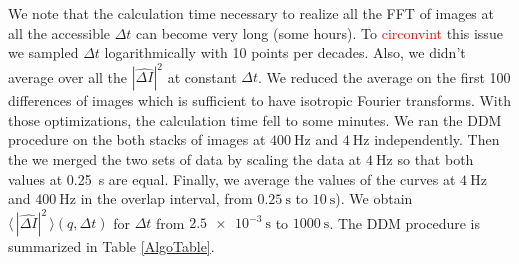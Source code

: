 \documentclass[%
 aip,
 jmp,%
 amsmath,amssymb,
reprint,%
]{revtex4-1}
\begin{document}
We note that the calculation time necessary to realize all the FFT of images at all the accessible $\Delta t$ can become very long (some hours). To \textcolor{red}{circonvint} this issue we sampled $\Delta t$ logarithmically with 10 points per decades.  Also, we didn't average over all the $|\widehat{\Delta I}|^2$ at constant $\Delta t$. We reduced the average on the first 100 differences of images which is sufficient to have isotropic Fourier transforms. With those optimizations, the calculation time fell to some minutes. We ran the DDM procedure on the both stacks of images at $\SI{400}{\hertz}$ and $\SI{4}{\hertz}$ independently. Then the we merged the two sets of data by scaling the data at $\SI{4}{\hertz}$ so that both values at \SI{0.25}{\second} are equal. Finally, we average the values of the curves at $\SI{4}{\hertz}$ and $\SI{400}{\hertz}$ in the overlap interval, from $\SI{0.25}{\second}$ to $\SI{10}{\second}$). We obtain $\langle \, |\widehat{\Delta I}|^2 \, \rangle (q, \Delta t)$ for $\Delta t$ from $\SI{2.5e-3}{\second}$ to $\SI{1000}{\second}$. The DDM procedure is summarized in Table \ref{AlgoTable}.
\end{document}
